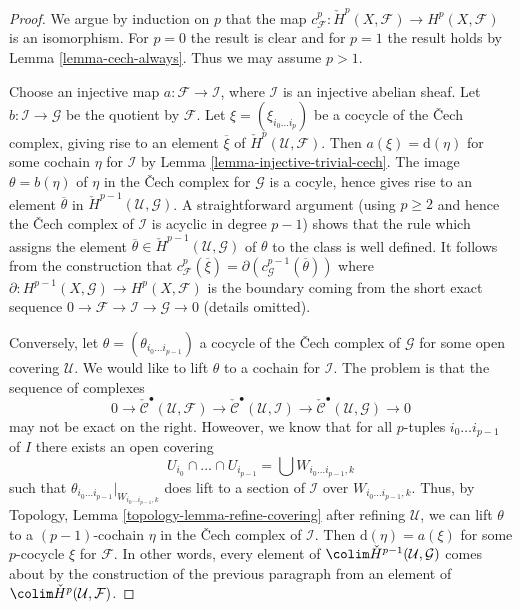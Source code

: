 \begin{proof}
We argue by induction on $p$ that the map
$c^p_\mathcal{F} : \check{H}^p(X, \mathcal{F}) \to H^p(X, \mathcal{F})$
is an isomorphism. For $p = 0$ the result is clear and for
$p = 1$ the result holds by Lemma \ref{lemma-cech-always}. Thus we may
assume $p > 1$.

\medskip\noindent
Choose an injective map $a : \mathcal{F} \to \mathcal{I}$, where $\mathcal{I}$
is an injective abelian sheaf. Let $b : \mathcal{I} \to \mathcal{G}$
be the quotient by $\mathcal{F}$.
Let $\xi = (\xi_{i_0 \ldots i_p})$ be a cocycle
of the {\v C}ech complex, giving rise to an element $\overline{\xi}$ of
$\check{H}^p(\mathcal{U}, \mathcal{F})$. Then $a(\xi) = \text{d}(\eta)$
for some cochain $\eta$ for $\mathcal{I}$ by
Lemma \ref{lemma-injective-trivial-cech}.
The image $\theta = b(\eta)$ of $\eta$ in
the {\v C}ech complex for $\mathcal{G}$ is a cocyle, hence gives
rise to an element $\overline{\theta}$ in
$\check{H}^{p - 1}(\mathcal{U}, \mathcal{G})$.
A straightforward argument (using $p \geq 2$ and hence the {\v C}ech
complex of $\mathcal{I}$ is acyclic in degree $p - 1$)
shows that the rule which assigns
the element $\overline{\theta} \in \check{H}^{p - 1}(\mathcal{U}, \mathcal{G})$
of $\theta$ to the class is well defined.
It follows from the construction that
$c^p_\mathcal{F}(\overline{\xi}) =
\partial(c^{p - 1}_\mathcal{G}(\overline{\theta}))$
where $\partial : H^{p - 1}(X, \mathcal{G}) \to H^p(X, \mathcal{F})$
is the boundary coming from the short exact sequence
$0 \to \mathcal{F} \to \mathcal{I} \to \mathcal{G} \to 0$ (details omitted).

\medskip\noindent
Conversely, let $\theta = (\theta_{i_0 \ldots i_{p - 1}})$ a cocycle
of the {\v C}ech complex of $\mathcal{G}$ for some open covering
$\mathcal{U}$. We would like to lift $\theta$ to a cochain for
$\mathcal{I}$. The problem is that the sequence of complexes
$$
0 \to \check{\mathcal{C}}^\bullet(\mathcal{U}, \mathcal{F}) \to
\check{\mathcal{C}}^\bullet(\mathcal{U}, \mathcal{I}) \to
\check{\mathcal{C}}^\bullet(\mathcal{U}, \mathcal{G}) \to 0
$$
may not be exact on the right. Howeover, we know that for all
$p$-tuples $i_0 \ldots i_{p - 1}$ of $I$ there exists an open covering
$$
U_{i_0} \cap \ldots \cap U_{i_{p - 1}} = \bigcup W_{i_0 \ldots i_{p - 1}, k}
$$
such that $\theta_{i_0 \ldots i_{p - 1}}|_{W_{i_0 \ldots i_{p - 1}, k}}$
does lift to a section of $\mathcal{I}$ over $W_{i_0 \ldots i_{p - 1}, k}$.
Thus, by Topology, Lemma \ref{topology-lemma-refine-covering}
after refining $\mathcal{U}$, we can lift $\theta$ to a $(p - 1)$-cochain
$\eta$ in the {\v C}ech complex of $\mathcal{I}$. Then
$\text{d}(\eta) = a(\xi)$ for some $p$-cocycle $\xi$ for $\mathcal{F}$.
In other words, every element of
$\colim \check{H}^{p - 1}(\mathcal{U}, \mathcal{G})$ comes about
by the construction of the previous paragraph from an element of
$\colim \check{H}^p(\mathcal{U}, \mathcal{F})$.


\end{proof}
